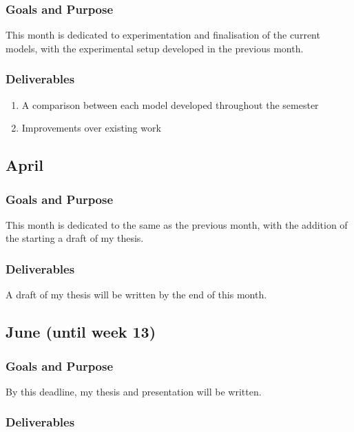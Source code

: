 \documentclass{article}
\begin{document}
{{\subsubsection{Goals and Purpose}

This month is dedicated to experimentation and finalisation of the current models, with the experimental setup developed in the previous month.

\subsubsection{Deliverables}

\begin{enumerate}
    \item A comparison between each model developed throughout the semester
    \item Improvements over existing work
\end{enumerate}

\subsection{April}

\subsubsection{Goals and Purpose}

This month is dedicated to the same as the previous month, with the addition of the starting a draft of my thesis.

\subsubsection{Deliverables}

A draft of my thesis will be written by the end of this month.

\subsection{June (until week 13)}

\subsubsection{Goals and Purpose}

By this deadline, my thesis and presentation will be written.

\subsubsection{Deliverables}

}}
\end{document}
